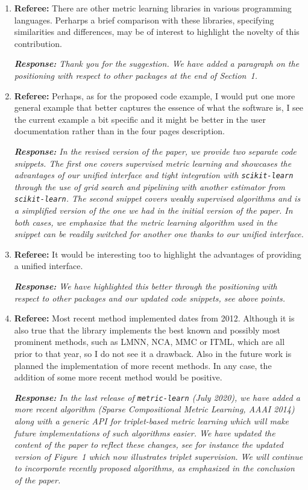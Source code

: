 \documentclass[a4paper,12pt]{article}
\begin{document}
\begin{enumerate}
    \item \textbf{Referee:} There are other metric learning libraries in various programming languages. Perharps a brief comparison with these libraries, specifying similarities and differences, may be of interest to highlight the novelty of this contribution.

    {\it \textbf{Response:} Thank you for the suggestion. We have added a
    paragraph on the positioning with respect to other packages at the end of
    Section~1.}

	\item \textbf{Referee:} Perhaps, as for the proposed code example, I would put one more general example that better captures the essence of what the software is, I see the current example a bit specific and it might be better in the user documentation rather than in the four pages description.
	
    {\it \textbf{Response:} In the revised version of the paper, we provide
    two separate code snippets. The first one covers supervised metric learning
    and showcases the advantages of our unified interface and tight
    integration with \texttt{scikit-learn} through the use of grid search and
    pipelining with another estimator from \texttt{scikit-learn}. The second
    snippet covers weakly supervised algorithms and is a simplified version of
    the one we had in the initial version of the paper. In both cases, we
    emphasize that the metric learning algorithm used in the snippet can
    be readily switched for another one thanks to our unified interface.}
	
    \item \textbf{Referee:} It would be interesting too to highlight the advantages of providing a unified interface.

    {\it \textbf{Response:} We have highlighted this better through
    the positioning with respect to other packages and our updated code
    snippets, see above points.}

    \item \textbf{Referee:} Most recent method implemented dates from 2012. Although it is also true that the library implements the best known and possibly most prominent methods, such as LMNN, NCA, MMC or ITML, which are all prior to that year, so I do not see it a drawback. Also in the future work is planned the implementation of more recent methods. In any case, the addition of some more recent method would be positive.

    {\it \textbf{Response:} In the last release of \texttt{metric-learn} 
    (July 2020), we have added a more recent algorithm (Sparse
    Compositional Metric Learning, AAAI 2014) along with a generic API for
    triplet-based metric learning which will make future implementations
    of such algorithms easier. We have updated the content of the paper to
    reflect these changes, see for instance the updated version of Figure~1
    which now illustrates triplet supervision. We will continue to incorporate
    recently proposed algorithms, as emphasized in the conclusion of the paper.}

\end{enumerate}


%
%
\end{document}
